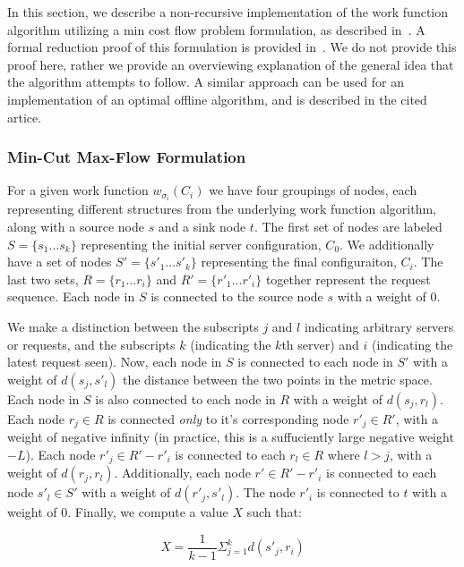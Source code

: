 In this section, we describe a non-recursive implementation of the work function algorithm utilizing a min cost flow problem formulation, as described in~\cite{mcfp2011}. A formal reduction proof of this formulation is provided in~\cite{mcfp2011}. We do not provide this proof here, rather we provide an overviewing explanation of the general idea that the algorithm attempts to follow. A similar approach can be used for an implementation of an optimal offline algorithm, and is described in the cited artice.

\subsubsection*{Min-Cut Max-Flow Formulation}
For a given work function $w_{\sigma_i}(C_i)$ we have four groupings of nodes, each representing different structures from the underlying work function algorithm, along with a source node $s$ and a sink node $t$. The first set of nodes are labeled $S = \{s_1 ... s_k\}$ representing the initial server configuration, $C_0$. We additionally have a set of nodes $S' = \{s'_1 ... s'_k\}$ representing the final configuraiton, $C_i$. The last two sets, $R = \{r_1 ... r_i\}$ and $R' = \{r'_1 ... r'_i\}$ together represent the request sequence. Each node in $S$ is connected to the source node $s$ with a weight of $0$.

We make a distinction between the subscripts $j$ and $l$ indicating arbitrary servers or requests, and the subscripts $k$ (indicating the $k$th server) and $i$ (indicating the latest request seen). Now, each node in $S$ is connected to each node in $S'$ with a weight of $d(s_j, s'_l)$ the distance between the two points in the metric space. Each node in $S$ is also connected to each node in $R$ with a weight of $d(s_j, r_l)$. Each node $r_j \in R$ is connected \textit{only} to it's corresponding node $r'_j\in R'$, with a weight of negative infinity (in practice, this is a suffuciently large negative weight $-L$). Each node $r'_j \in R' - r'_i$ is connected to each $r_l \in R$ where $l > j$, with a weight of $d(r_j, r_l)$. Additionally, each node $r' \in R'-r'_i$ is connected to each node $s'_l \in S'$ with a weight of $d(r'_j, s'_l)$. The node $r'_i$ is connected to $t$ with a weight of $0$. Finally, we compute a value $X$ such that:

\begin{equation*}
    X = \frac{1}{k-1} \Sigma_{j=1}^{k} d(s'_j, r_i)
\end{equation*}


